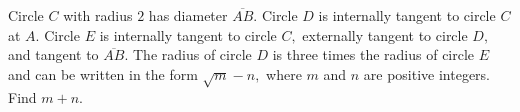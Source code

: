 Circle $C$ with radius $2$ has diameter $\overline{AB}$. Circle $D$ is internally tangent to circle $C$ at $A$. Circle $E$ is internally tangent to circle $C,$ externally tangent to circle $D,$ and tangent to $\overline{AB}$. The radius of circle $D$ is three times the radius of circle $E$ and can be written in the form $\sqrt{m} - n,$ where $m$ and $n$ are positive integers. Find $m+n$.